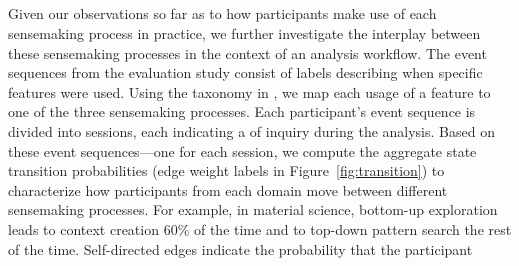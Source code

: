 \subsection{}
Given our observations so far as to
how participants
make use of each sensemaking process in practice,
we further investigate the interplay
between these sensemaking processes
in the context of an analysis workflow. %
The event sequences from the evaluation study
consist of labels describing when specific features were used.
Using the taxonomy in , we map each usage of a feature  to one of the three sensemaking processes.
Each participant's event sequence
is divided into sessions,
each indicating a  of inquiry
during the analysis.
Based on these event sequences---one for each session,
we compute the aggregate state transition probabilities
(edge weight labels in Figure~\ref{fig:transition})
to characterize how participants from each domain
move between different sensemaking processes.
For example, in material science,
bottom-up exploration
leads to context creation 60\% of the time
and to top-down pattern search
the rest of the time.
Self-directed edges indicate the probability that the participant
